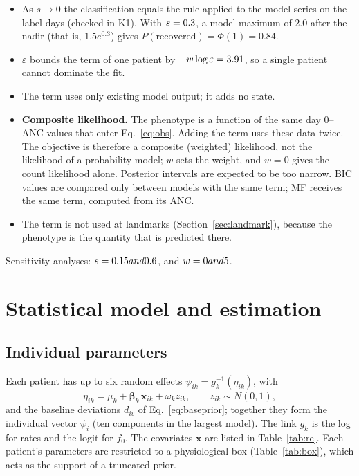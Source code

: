 \documentclass[11pt]{article}
\begin{document}
\begin{itemize}
\item As $s\to0$ the classification equals the rule applied to the model series on the label days (checked in K1). With $s=0.3$, a model maximum of 2.0 after the nadir (that is, $1.5e^{0.3}$) gives $P(\text{recovered})=\Phi(1)=0.84$.
\item $\varepsilon$ bounds the term of one patient by $-w\log\varepsilon=3.91$, so a single patient cannot dominate the fit.
\item The term uses only existing model output; it adds no state.
\item \textbf{Composite likelihood.} The phenotype is a function of the same day 0--\valPhWin{} ANC values that enter Eq.~\ref{eq:obs}. Adding the term uses these data twice. The objective is therefore a composite (weighted) likelihood, not the likelihood of a probability model; $w$ sets the weight, and $w=0$ gives the count likelihood alone. Posterior intervals are expected to be too narrow. BIC values are compared only between models with the same term; MF receives the same term, computed from its ANC.
\item The term is not used at landmarks (Section~\ref{sec:landmark}), because the phenotype is the quantity that is predicted there.
\end{itemize}
Sensitivity analyses: $s=0.15 and 0.6$, and $w=0 and 5$.

\section{Statistical model and estimation}\label{sec:stat}

\subsection{Individual parameters}
Each patient has up to six random effects $\psi_{ik}=g_k^{-1}(\eta_{ik})$, with
\begin{equation}
\eta_{ik} = \mu_k + \boldsymbol\beta_k^\top \mathbf{x}_{ik} + \omega_k z_{ik},\qquad z_{ik}\sim N(0,1),
\end{equation}
and the baseline deviations $d_{iv}$ of Eq.~\ref{eq:baseprior}; together they form the individual vector $\psi_i$ (ten components in the largest model). The link $g_k$ is the log for rates and the logit for $f_0$. The covariates $\mathbf{x}$ are listed in Table~\ref{tab:re}. Each patient's parameters are restricted to a physiological box (Table~\ref{tab:box}), which acts as the support of a truncated prior.
\end{document}
